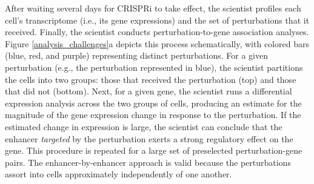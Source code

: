\documentclass[12pt]{article}
\begin{document}
After waiting several days for CRISPRi to take effect, the scientist profiles each cell's transcriptome (i.e., its gene expressions) and the set of perturbations that it received. Finally, the scientist conducts perturbation-to-gene association analyses. Figure \ref{analysis_challenges}a depicts this process schematically, with colored bars (blue, red, and purple) representing distinct perturbations. For a given perturbation (e.g., the perturbation represented in blue), the scientist partitions the cells into two groups: those that received the perturbation (top) and those that did not (bottom). Next, for a given gene, the scientist runs a differential expression analysis across the two groups of cells, producing an estimate for the magnitude of the gene expression change in response to the perturbation. If the estimated change in expression is large, the scientist can conclude that the enhancer \textit{targeted} by the perturbation exerts a strong regulatory effect on the gene. This procedure is repeated for a large set of preselected perturbation-gene pairs. The enhancer-by-enhancer approach is valid because the perturbations assort into cells approximately independently of one another.
\end{document}
